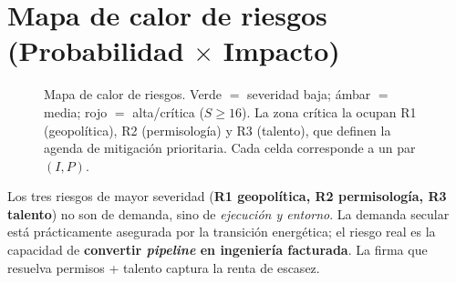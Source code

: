 \documentclass[11pt,letterpaper]{report}
\begin{document}
\section{Mapa de calor de riesgos (Probabilidad \texorpdfstring{$\times$}{x} Impacto)}
\begin{figure}[htbp]
\centering
{}
\caption[Mapa de calor de riesgos probabilidad $\times$ impacto]{Mapa de calor de riesgos. Verde $=$ severidad baja; ámbar $=$
media; rojo $=$ alta/crítica ($S\ge 16$). La zona crítica la ocupan R1 (geopolítica), R2 (permisología) y R3 (talento), que definen
la agenda de mitigación prioritaria. Cada celda corresponde a un par $(I,P)$.}
\label{fig:heatmap}
\end{figure}

\begin{cajariesgo}
Los tres riesgos de mayor severidad (\textbf{R1 geopolítica, R2 permisología, R3 talento}) no son de demanda, sino de
\emph{ejecución y entorno}. La demanda secular está prácticamente asegurada por la transición energética; el riesgo real es la
capacidad de \textbf{convertir \emph{pipeline} en ingeniería facturada}. La firma que resuelva permisos + talento captura la renta
de escasez.
\end{cajariesgo}
\end{document}
